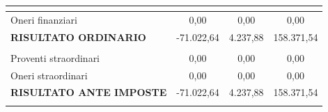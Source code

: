 \documentclass[12pt, a4paper]{article}
\begin{document}
\begin{tabular}{|lccc|}
    \multicolumn{4}{|l|}{}                                                                                                                                                                                                                                                                          \\ \hline
    \multicolumn{1}{|l|}{Oneri finanziari}                                                                                           & \multicolumn{1}{c|}{0,00}                                         & \multicolumn{1}{c|}{0,00}                                         & 0,00                 \\ \hline
    \multicolumn{1}{|l|}{\cellcolor[HTML]{CBCEFB}\textbf{RISULTATO ORDINARIO}}                                                       & \multicolumn{1}{c|}{-71.022,64}                                   & \multicolumn{1}{c|}{4.237,88}                                     & 158.371,54           \\ \hline
    \multicolumn{4}{|l|}{}                                                                                                                                                                                                                                                                          \\ \hline
    \multicolumn{1}{|l|}{Proventi straordinari}                                                                                      & \multicolumn{1}{c|}{0,00}                                         & \multicolumn{1}{c|}{0,00}                                         & 0,00                 \\ \hline
    \multicolumn{1}{|l|}{Oneri straordinari}                                                                                         & \multicolumn{1}{c|}{0,00}                                         & \multicolumn{1}{c|}{0,00}                                         & 0,00                 \\ \hline
    \multicolumn{1}{|l|}{\cellcolor[HTML]{CBCEFB}\textbf{RISULTATO ANTE IMPOSTE}}                                                    & \multicolumn{1}{c|}{-71.022,64}                                   & \multicolumn{1}{c|}{4.237,88}                                     & 158.371,54           \\ \hline
    \multicolumn{4}{|l|}{}                                                                                                                                                                                                                                                                          \\ \hline

\end{tabular}
\end{document}
